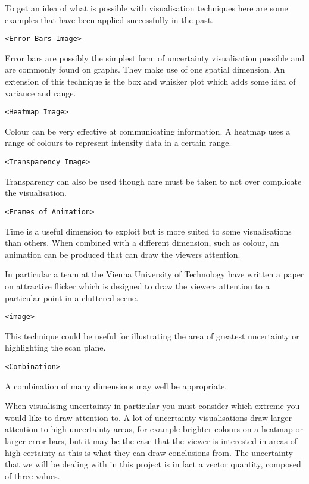 \documentclass[
  oneside,
  11pt, a4paper,
  footinclude=true,
  headinclude=true,
  cleardoublepage=empty
]{scrbook}
\begin{document}
To get an idea of what is possible with visualisation techniques here are some examples that have been applied successfully in the past.

\begin{verbatim}
<Error Bars Image>
\end{verbatim}

Error bars are possibly the simplest form of uncertainty visualisation possible and are commonly found on graphs. They make use of one spatial dimension. An extension of this technique is the box and whisker plot which adds some idea of variance and range.

\begin{verbatim}
<Heatmap Image>
\end{verbatim}

Colour can be very effective at communicating information. A heatmap uses a range of colours to represent intensity data in a certain range.

\begin{verbatim}
<Transparency Image>
\end{verbatim}

Transparency can also be used though care must be taken to not over complicate the visualisation.

\begin{verbatim}
<Frames of Animation>
\end{verbatim}

Time is a useful dimension to exploit but is more suited to some visualisations than others. When combined with a different dimension, such as colour, an animation can be produced that can draw the viewers attention.

In particular a team at the Vienna University of Technology have written a paper on attractive flicker which is designed to draw the viewers attention to a particular point in a cluttered scene\cite{attractiveflicker}.

\begin{verbatim}
<image>
\end{verbatim}

This technique could be useful for illustrating the area of greatest uncertainty or highlighting the scan plane.

\begin{verbatim}
<Combination>
\end{verbatim}

A combination of many dimensions may well be appropriate.

When visualising uncertainty in particular you must consider which extreme you would like to draw attention to. A lot of uncertainty visualisations draw larger attention to high uncertainty areas, for example brighter colours on a heatmap or larger error bars, but it may be the case that the viewer is interested in areas of high certainty as this is what they can draw conclusions from.
The uncertainty that we will be dealing with in this project is in fact a vector quantity, composed of three values. 
\end{document}
